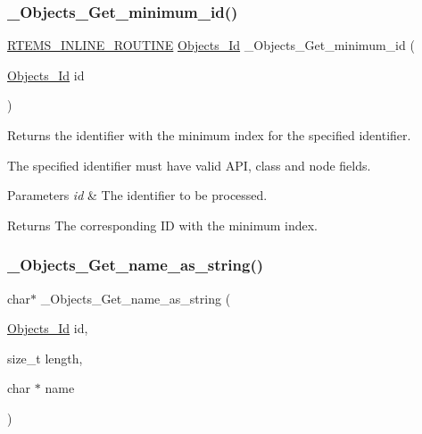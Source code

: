 \subsubsection{\texorpdfstring{\_Objects\_Get\_minimum\_id()}{\_Objects\_Get\_minimum\_id()}}
{\footnotesize\ttfamily \mbox{\hyperlink{group__RTEMSScoreBaseDefs_gac216239df231d5dbd15e3520b0b9313f}{R\+T\+E\+M\+S\+\_\+\+I\+N\+L\+I\+N\+E\+\_\+\+R\+O\+U\+T\+I\+NE}} \mbox{\hyperlink{group__RTEMSScoreObject_ga5821f52a51072941bdd603e542d0863e}{Objects\+\_\+\+Id}} \+\_\+\+Objects\+\_\+\+Get\+\_\+minimum\+\_\+id (\begin{DoxyParamCaption}\item[{\mbox{\hyperlink{group__RTEMSScoreObject_ga5821f52a51072941bdd603e542d0863e}{Objects\+\_\+\+Id}}}]{id }\end{DoxyParamCaption})}



Returns the identifier with the minimum index for the specified identifier. 

The specified identifier must have valid A\+PI, class and node fields.


\begin{DoxyParams}{Parameters}
{\em id} & The identifier to be processed.\\
\hline
\end{DoxyParams}
\begin{DoxyReturn}{Returns}
The corresponding ID with the minimum index. 
\end{DoxyReturn}
\mbox{\label{group__RTEMSScoreObject_gabd551c27404cc5db7e78b6ad24a5dda9}} 
\subsubsection{\texorpdfstring{\_Objects\_Get\_name\_as\_string()}{\_Objects\_Get\_name\_as\_string()}}
{\footnotesize\ttfamily char$\ast$ \+\_\+\+Objects\+\_\+\+Get\+\_\+name\+\_\+as\+\_\+string (\begin{DoxyParamCaption}\item[{\mbox{\hyperlink{group__RTEMSScoreObject_ga5821f52a51072941bdd603e542d0863e}{Objects\+\_\+\+Id}}}]{id,  }\item[{size\+\_\+t}]{length,  }\item[{char $\ast$}]{name }\end{DoxyParamCaption})}



